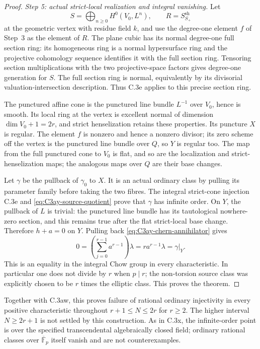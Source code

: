 \begin{proof}
\emph{Step 5: actual strict-local realization and integral vanishing.}
Let
\[
 S=\bigoplus_{n\ge0}H^0(V_0,L^n),\qquad
 R=S_{S_+}^{\mathrm{sh}}
\]
at the geometric vertex with residue field $k$, and use the degree-one
element $f$ of Step~3 as the element of $R$.
The plane cubic has its normal degree-one full section ring: its
homogeneous ring is a normal hypersurface ring and the projective
cohomology sequence identifies it with the full section ring.
Tensoring section multiplications with the two projective-space
factors gives degree-one generation for $S$. The full section ring
is normal, equivalently by its divisorial valuation-intersection
description. Thus C.3e applies to this precise section ring.

The punctured affine cone is the punctured line bundle $L^{-1}$ over
$V_0$, hence is smooth. Its local ring at the vertex is excellent
normal of dimension $\dim V_0+1=2r$, and strict henselization retains
these properties. Its puncture $X$ is regular. The element $f$ is
nonzero and hence a nonzero divisor; its zero scheme off the vertex
is the punctured line bundle over $Q$, so $Y$ is regular too.
The map from the full punctured cone to $V_0$ is flat, and so are
the localization and strict-henselization maps; the analogous maps
over $Q$ are their base changes.

Let $\gamma$ be the pullback of $\gamma_0$ to $X$.
It is an actual ordinary class by pulling its parameter family before
taking the two fibres. The integral strict-cone injection C.3e and
\eqref{eq:C3ay-source-quotient} prove that $\gamma$ has infinite
order. On $Y$, the pullback of $L$ is trivial: the punctured line
bundle has its tautological nowhere-zero section, and this remains
true after the flat strict-local base change. Therefore $h+a=0$
on $Y$. Pulling back \eqref{eq:C3ay-chern-annihilator} gives
\[
 0=\left(\sum_{j=0}^{r-1}a^{r-1}\right)\lambda
                         =r a^{r-1}\lambda=\gamma|_Y.
\]
This is an equality in the integral Chow group in every characteristic.
In particular one does not divide by $r$ when $p\mid r$; the
non-torsion source class was explicitly chosen to be $r$ times the
elliptic class. This proves the theorem.
\end{proof}

Together with C.3aw, this proves failure of rational ordinary
injectivity in every positive characteristic throughout
$r+1\le N\le2r$ for $r\ge2$. The higher interval $N\ge2r+1$
is not settled by this construction. As in C.3x, the infinite-order
point is over the specified transcendental algebraically closed field;
ordinary rational classes over $\overline{\mathbb F}_p$ itself
vanish and are not counterexamples.

